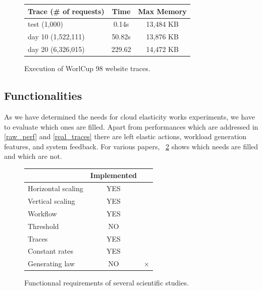 \documentclass[a4paper, onecolumn, 11pt]{article}
\begin{document}
		\begin{figure}
			\centering
	    \begin{center}
	     	\begin{tabular}{| l | c | c |}
	     		\hline
	     		Trace (\# of requests) & Time & Max Memory\\ 
	     		\hline
	     		test (1,000) & 0.14s & 13,484 KB\\
		      \hline
		      day 10 (1,522,111) & 50.82s & 13,876 KB\\
		      \hline
		      day 20 (6,326,015) & 229.62 & 14,472 KB\\
	     		\hline
	     	\end{tabular}
	    \end{center}
	    \caption{Execution of WorlCup 98 website traces.}
	    \label{tab_traces}
	  \end{figure}
  
  \subsection{Functionalities}
	  As we have determined the needs for cloud elasticity works experiments, we 
	  have to evaluate which ones are filled. Apart from performances which are 
	  addressed in \ref{raw_perf} and \ref{real_traces} there are left elastic 
	  actions, workload generation features, and system feedback. For various 
	  papers, \figurename~\ref{table_func} shows which needs are filled and which 
	  are not.
  
	  \begin{figure}
	  	\centering
	  	\begin{center}
	  		\begin{tabular}{| l | c | c |}
	  			\hline
	  			& Implemented & \cite{vasic2012dejavu}\\ 
	  			\hline
	  			Horizontal scaling & YES & \checkmark\\
	  			\hline
	  			Vertical scaling & YES & \checkmark\\
	  			\hline
	  			Workflow & YES & \\
	  			\hline
	  			Threshold & NO & \\  %
	  			\hline
	  			Traces & YES & \\
	  			\hline
	  			Constant rates & YES & \\
	  			\hline
	  			Generating law & NO & $\times$ \\
	  			\hline
	  		\end{tabular}
	  	\end{center}
	  	\caption{Functionnal requirements of several scientific studies.}
	  	\label{table_func}
	  \end{figure}
  
\end{document}

